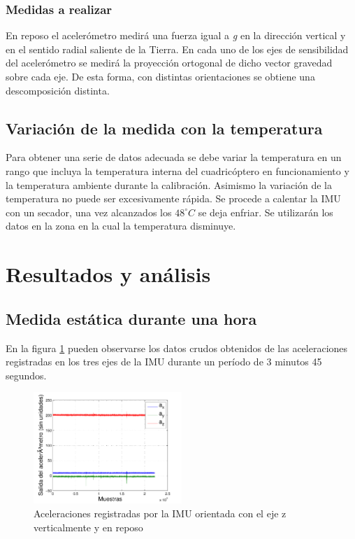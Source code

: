 \documentclass[main]{subfiles}
\begin{document}
\subsubsection*{Medidas a realizar}
En reposo el acelerómetro medirá una fuerza igual a \textit{g} en la dirección vertical y en el sentido radial saliente de la Tierra. En cada uno de los ejes de sensibilidad del acelerómetro se medirá la proyección ortogonal de dicho vector gravedad sobre cada eje. De esta forma, con distintas orientaciones se obtiene una descomposición distinta.

\subsection{Variaci\'on de la medida con la temperatura}
Para obtener una serie de datos adecuada se debe variar la temperatura en un rango que incluya la temperatura interna del cuadric\'optero en funcionamiento y la temperatura ambiente durante la calibraci\'on. Asimismo la variaci\'on de la temperatura no puede ser excesivamente r\'apida. Se procede a calentar la IMU con un secador, una vez alcanzados los $48^\circ C$ se deja enfriar. Se utilizar\'an los datos en la zona en la cual la temperatura disminuye. 

\section{Resultados y análisis}
\subsection{Medida estática durante una hora}

En la figura \ref{fig:rrtests} pueden observarse los datos crudos obtenidos de las aceleraciones registradas en los tres ejes de la IMU durante un período de 3 minutos 45 segundos.

\begin{figure}[h!]
  \begin{center}
    \includegraphics[width=0.5\textwidth]{./pics_acc/rrtests.pdf}
  \end{center}
  \caption{Aceleraciones registradas por la IMU orientada con el eje z verticalmente y en reposo}
  \label{fig:rrtests}

\end{figure}
\end{document}
